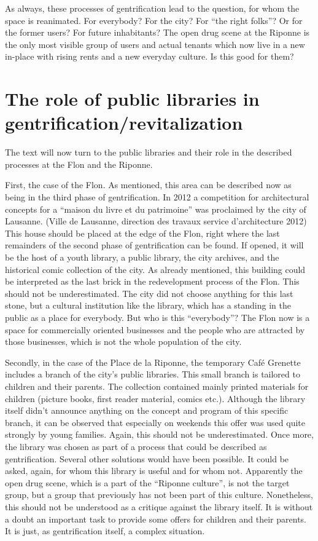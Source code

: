 \documentclass[a4paper,
fontsize=11pt,
oneside,
numbers=noperiodatend,
parskip=half-,
bibliography=totoc,
final
]{scrartcl}
\begin{document}
As always, these processes of gentrification lead to the question, for
whom the space is reanimated. For everybody? For the city? For
\enquote{the right folks}? Or for the former users? For future
inhabitants? The open drug scene at the Riponne is the only most visible
group of users and actual tenants which now live in a new in-place with
rising rents and a new everyday culture. Is this good for them?

\section{The role of public libraries in
gentrification/revitalization}\label{the-role-of-public-libraries-in-gentrificationrevitalization}

The text will now turn to the public libraries and their role in the
described processes at the Flon and the Riponne.

First, the case of the Flon. As mentioned, this area can be described
now as being in the third phase of gentrification. In 2012 a competition
for architectural concepts for a \enquote{maison du livre et du
patrimoine} was proclaimed by the city of Lausanne. (Ville de Lausanne,
direction des travaux service d'architecture 2012) This house should be
placed at the edge of the Flon, right where the last remainders of the
second phase of gentrification can be found. If opened, it will be the
host of a youth library, a public library, the city archives, and the
historical comic collection of the city. As already mentioned, this
building could be interpreted as the last brick in the redevelopment
process of the Flon. This should not be underestimated. The city did not
choose anything for this last stone, but a cultural institution like the
library, which has a standing in the public as a place for everybody.
But who is this \enquote{everybody}? The Flon now is a space for
commercially oriented businesses and the people who are attracted by
those businesses, which is not the whole population of the city.

Secondly, in the case of the Place de la Riponne, the temporary Café
Grenette includes a branch of the city's public libraries. This small
branch is tailored to children and their parents. The collection
contained mainly printed materials for children (picture books, first
reader material, comics etc.). Although the library itself didn't
announce anything on the concept and program of this specific branch, it
can be observed that especially on weekends this offer was used quite
strongly by young families. Again, this should not be underestimated.
Once more, the library was chosen as part of a process that could be
described as gentrification. Several other solutions would have been
possible. It could be asked, again, for whom this library is useful and
for whom not. Apparently the open drug scene, which is a part of the
\enquote{Riponne culture}, is not the target group, but a group that
previously has not been part of this culture. Nonetheless, this should
not be understood as a critique against the library itself. It is
without a doubt an important task to provide some offers for children
and their parents. It is just, as gentrification itself, a complex
situation.
\end{document}
